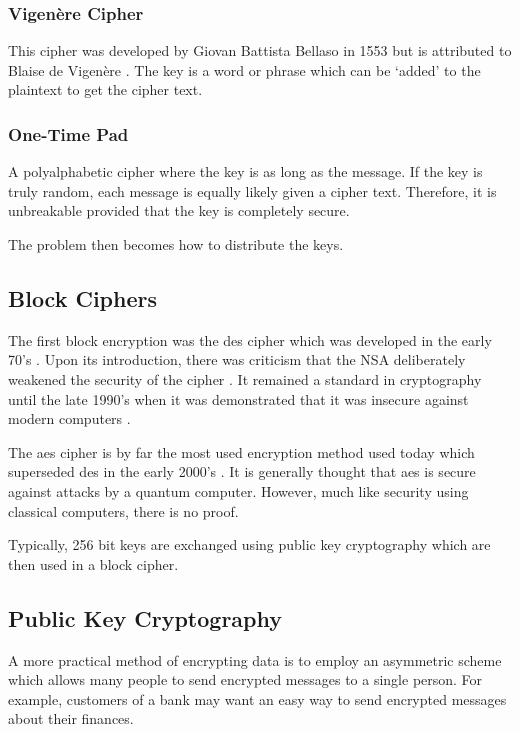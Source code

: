 \subsubsection*{Vigen\`{e}re Cipher}

This cipher was developed by Giovan Battista Bellaso in 1553 \cite{} but is attributed to Blaise de Vigen\`{e}re \cite{}. The key is a word or phrase which can be `added' to the plaintext to get the cipher text.

\subsubsection*{One-Time Pad}

A polyalphabetic cipher where the key is as long as the message. If the key is truly random, each message is equally likely given a cipher text. Therefore, it is unbreakable provided that the key is completely secure.

The problem then becomes how to distribute the keys.

\subsection{Block Ciphers}

The first block encryption was the \ac{des} cipher which was developed in the early 70's \cite{}. Upon its introduction, there was criticism that the NSA deliberately weakened the security of the cipher \cite{Diffie1977}. It remained a standard in cryptography until the late 1990's when it was demonstrated that it was insecure against modern computers \cite{}.

The \ac{aes} cipher is by far the most used encryption method used today which superseded \ac{des} in the early 2000's \cite{}. It is generally thought that \ac{aes} is secure against attacks by a quantum computer. However, much like security using classical computers, there is no proof.

Typically, 256 bit keys are exchanged using public key cryptography which are then used in a block cipher. 

\subsection{Public Key Cryptography}

A more practical method of encrypting data is to employ an asymmetric scheme which allows many people to send encrypted messages to a single person. For example, customers of a bank may want an easy way to send encrypted messages about their finances.

